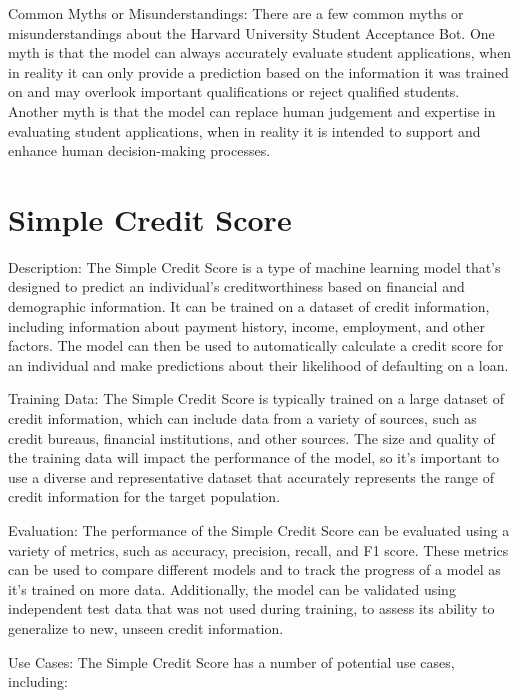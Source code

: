 Common Myths or Misunderstandings:
There are a few common myths or misunderstandings about the Harvard University Student Acceptance Bot. One myth is that the model can always accurately evaluate student applications, when in reality it can only provide a prediction based on the information it was trained on and may overlook important qualifications or reject qualified students. Another myth is that the model can replace human judgement and expertise in evaluating student applications, when in reality it is intended to support and enhance human decision-making processes.

\section{Simple Credit Score}

Description:
The Simple Credit Score is a type of machine learning model that's designed to predict an individual's creditworthiness based on financial and demographic information. It can be trained on a dataset of credit information, including information about payment history, income, employment, and other factors. The model can then be used to automatically calculate a credit score for an individual and make predictions about their likelihood of defaulting on a loan.

Training Data:
The Simple Credit Score is typically trained on a large dataset of credit information, which can include data from a variety of sources, such as credit bureaus, financial institutions, and other sources. The size and quality of the training data will impact the performance of the model, so it's important to use a diverse and representative dataset that accurately represents the range of credit information for the target population.

Evaluation:
The performance of the Simple Credit Score can be evaluated using a variety of metrics, such as accuracy, precision, recall, and F1 score. These metrics can be used to compare different models and to track the progress of a model as it's trained on more data. Additionally, the model can be validated using independent test data that was not used during training, to assess its ability to generalize to new, unseen credit information.

Use Cases:
The Simple Credit Score has a number of potential use cases, including:

